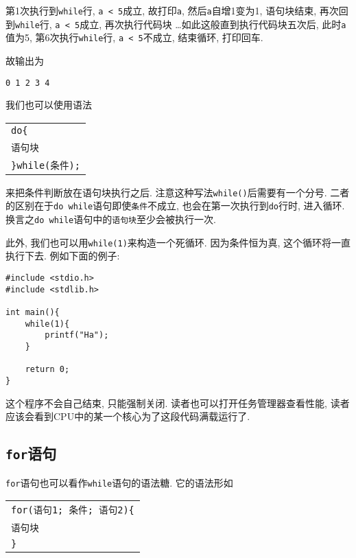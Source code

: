             第1次执行到\texttt{while}行, \texttt{a < 5}成立, 故打印\texttt{a}, 然后\texttt{a}自增1变为1, 语句块结束, 再次回到\texttt{while}行, \texttt{a < 5}成立, 再次执行代码块 \dots 如此这般直到执行代码块五次后, 此时\texttt{a}值为5, 第6次执行\texttt{while}行, \texttt{a < 5}不成立, 结束循环, 打印回车.

            故输出为
\begin{lstlisting}
0 1 2 3 4 
\end{lstlisting}

            我们也可以使用语法
            \begin{center}
            \begin{longtable}{l}
                \texttt{do\{} \\
                \qquad \texttt{语句块} \\
                \texttt{\}while(条件);}
            \end{longtable}
            \end{center}
            来把条件判断放在语句块执行之后. 注意这种写法\texttt{while()}后需要有一个分号. 二者的区别在于\texttt{do while}语句即使\texttt{条件}不成立, 也会在第一次执行到\texttt{do}行时, 进入循环. 换言之\texttt{do while}语句中的\texttt{语句块}至少会被执行一次.

            此外, 我们也可以用\texttt{while(1)}来构造一个死循环. 因为条件恒为真, 这个循环将一直执行下去. 例如下面的例子:
\begin{lstlisting}
#include <stdio.h>
#include <stdlib.h>

int main(){
    while(1){
        printf("Ha");
    }

    return 0;
}
\end{lstlisting}

            这个程序不会自己结束, 只能强制关闭. 读者也可以打开任务管理器查看性能, 读者应该会看到CPU中的某一个核心为了这段代码满载运行了.

            \subsection*{\texttt{for}语句}
            \texttt{for}语句也可以看作\texttt{while}语句的语法糖. 它的语法形如
            \begin{center}
            \begin{longtable}{l}
                \texttt{for(语句\hspace*{-0.25pt}1; 条件; 语句\hspace*{-0.25pt}2)\{} \\
                \qquad \texttt{语句块} \\
                \texttt{\}}       
            \end{longtable}
            \end{center}

